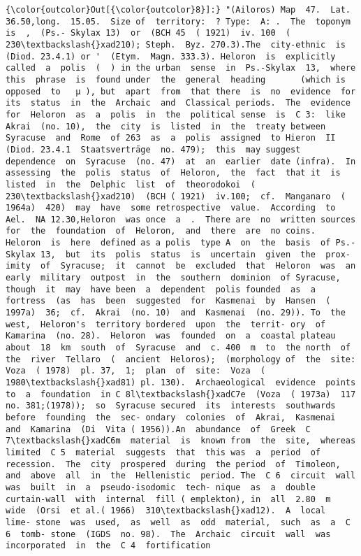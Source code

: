 \documentclass[11pt]{article}
\begin{document}
            \begin{Verbatim}[commandchars=\\\{\}]
{\color{outcolor}Out[{\color{outcolor}8}]:} "(Ailoros) Map  47.  Lat. 36.50,long.  15.05.  Size of  territory:  ? Type:  A: .  The  toponym  is  ,  (Ps.- Skylax 13)  or  (BCH 45  ( 1921)  iv. 100  ( 230\textbackslash{}xad210); Steph.  Byz. 270.3).The  city-ethnic  is  (Diod. 23.4.1) or '  (Etym.  Magn. 333.3). Heloron  is  explicitly  called  a  polis  (  ) in the urban  sense  in  Ps.-Skylax  13,  where  this  phrase  is  found under  the  general  heading       (which is  opposed  to   µ ), but  apart  from  that there  is  no  evidence  for  its  status  in  the  Archaic  and  Classical periods.  The  evidence  for  Heloron  as  a  polis  in  the  political sense  is  C 3:  like  Akrai  (no. 10),  the  city  is  listed  in  the  treaty between  Syracuse  and  Rome  of 263  as  a  polis  assigned  to Hieron  II  (Diod. 23.4.1  Staatsverträge  no. 479);  this  may suggest  dependence  on  Syracuse  (no. 47)  at  an  earlier  date (infra).  In  assessing  the  polis  status  of  Heloron,  the  fact  that it  is  listed  in  the  Delphic  list  of  theorodokoi  ( 230\textbackslash{}xad210)  (BCH ( 1921)  iv.100;  cf.  Manganaro  ( 1964a)  420)  may  have  some retrospective  value.  According  to Ael.  NA 12.30,Heloron  was once  a  .  There are  no  written sources  for  the  foundation  of  Heloron,  and  there  are  no coins.  Heloron  is  here  defined as a polis  type A  on  the  basis  of Ps.-Skylax 13,  but  its  polis  status  is  uncertain  given  the  prox- imity  of  Syracuse;  it  cannot  be  excluded  that  Heloron  was  an early  military  outpost  in  the  southern  dominion  of Syracuse,  though  it  may  have been  a  dependent  polis founded  as  a  fortress  (as  has  been  suggested  for  Kasmenai  by  Hansen  ( 1997a)  36;  cf.  Akrai  (no. 10)  and  Kasmenai  (no. 29)). To  the  west,  Heloron's  territory bordered  upon  the  territ- ory  of  Kamarina  (no. 28).  Heloron  was  founded  on  a  coastal plateau  about  18  km  south  of  Syracuse  and  c. 400  m  to  the north  of  the  river  Tellaro  (  ancient  Heloros);  (morphology of  the  site:  Voza  ( 1978)  pl. 37,  1;  plan  of  site:  Voza  ( 1980\textbackslash{}xad81) pl. 130).  Archaeological  evidence  points  to  a  foundation  in C 8l\textbackslash{}xadC7e  (Voza  ( 1973a)  117  no. 381;(1978));  so  Syracuse secured  its  interests  southwards  before  founding  the  sec- ondary  colonies  of  Akrai,  Kasmenai  and  Kamarina  (Di  Vita ( 1956)).An  abundance  of  Greek  C 7\textbackslash{}xadC6m  material  is  known from  the  site,  whereas  limited  C 5  material  suggests  that  this was  a  period  of  recession.  The  city  prospered  during  the period  of  Timoleon,  and  above  all  in  the  Hellenistic  period. The  C 6  circuit  wall  was  built  in  a  pseudo-isodomic  tech- nique  as  a  double  curtain-wall  with  internal  fill ( emplekton), in  all  2.80  m  wide  (Orsi  et al.( 1966)  310\textbackslash{}xad12).  A  local  lime- stone  was  used,  as  well  as  odd  material,  such  as  a  C 6  tomb- stone  (IGDS  no. 98).  The  Archaic  circuit  wall  was incorporated  in  the  C 4  fortification 
\end{Verbatim}
\end{document}
